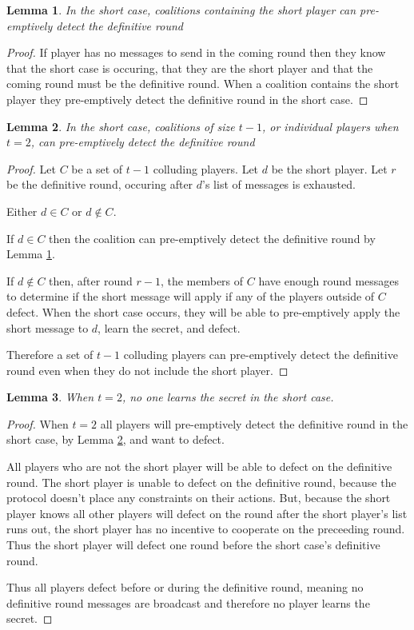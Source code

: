 \documentclass{dalcsthesis}
\newtheorem{lemma}{Lemma}
\begin{document}
\begin{lemma} In the short case, coalitions containing the short player can pre-emptively detect the definitive round \label{Lem:SUIP:ShortPlayerCoalitionsPremptivelyKnowShortRound} \end{lemma}
\begin{proof}
If player has no messages to send in the coming round then they know that the short case is occuring, that they are the short player and that the coming round must be the definitive round. When a coalition contains the short player they pre-emptively detect the definitive round in the short case.
\end{proof}

\begin{lemma} In the short case, coalitions of size $t-1$, or individual players when $t = 2$, can pre-emptively detect the definitive round \label{Lem:SUIP:MaxSizeCoalitionsPremptivelyKnowShortRound} \end{lemma}
\begin{proof}
Let $C$ be a set of $t-1$ colluding players. Let $d$ be the short player. Let $r$ be the definitive round, occuring after $d$'s list of messages is exhausted.

Either $d \in C$ or $d \notin C$.

If $d \in C$ then the coalition can pre-emptively detect the definitive round by Lemma \ref{Lem:SUIP:ShortPlayerCoalitionsPremptivelyKnowShortRound}.

If $d \notin C$ then, after round $r-1$, the members of $C$ have enough round messages to determine if the short message will apply if any of the players outside of $C$ defect. When the short case occurs, they will be able to pre-emptively apply the short message to $d$, learn the secret, and defect.

Therefore a set of $t-1$ colluding players can pre-emptively detect the definitive round even when they do not include the short player.
\end{proof}

\begin{lemma} When $t=2$, no one learns the secret in the short case. \label{Lem:SUIP:MinimumThresholdAndShortCaseMeansNoOneLearnsSecret} \end{lemma}
\begin{proof}
When $t=2$ all players will pre-emptively detect the definitive round in the short case, by Lemma \ref{Lem:SUIP:MaxSizeCoalitionsPremptivelyKnowShortRound}, and want to defect.

All players who are not the short player will be able to defect on the definitive round. The short player is unable to defect on the definitive round, because the protocol doesn't place any constraints on their actions. But, because the short player knows all other players will defect on the round after the short player's list runs out, the short player has no incentive to cooperate on the preceeding round. Thus the short player will defect one round before the short case's definitive round.

Thus all players defect before or during the definitive round, meaning no definitive round messages are broadcast and therefore no player learns the secret.
\end{proof}
\end{document}
